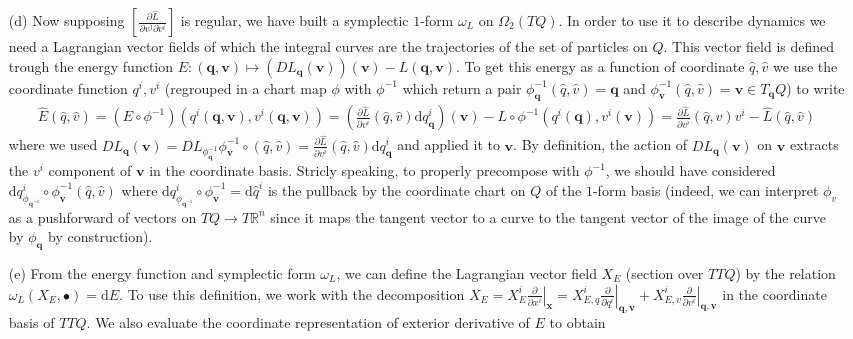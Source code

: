 \documentclass[10pt, a4paper]{article}
\begin{document}
{\begin{enumerate}
  \item[(d)] Now supposing $\left[\frac{\partial \hat{L}}{\partial v^j \partial v^i}\right]$ is regular, we have built a symplectic $1$-form $\omega_L$ on $\Omega_2(TQ)$. In order to use it to describe dynamics we need a Lagrangian vector fields of which the integral curves are the trajectories of the set of particles on $Q$. This vector field is defined trough the energy function $E : (\mathbf{q}, \mathbf{v}) \mapsto (DL_{\mathbf{q}}(\mathbf{v}))(\mathbf{v}) - L(\mathbf{q}, \mathbf{v})$. To get this energy as a function of coordinate $\hat{q}, \hat{v}$ we use the coordinate function $q^{i}, v^{i}$ (regrouped in a chart map $\phi$ with $\phi^{-1}$ which return a pair $\phi^{-1}_{\mathbf{q}}(\hat{q}, \hat{v}) = \mathbf{q}$ and $\phi^{-1}_{\mathbf{v}}(\hat{q}, \hat{v}) = \mathbf{v}\in T_{\mathbf{q}}Q$) to write 
  \begin{align*}
    \hat{E}(\hat{q}, \hat{v}) = (E \circ \phi^{-1})(q^{i}(\mathbf{q}, \mathbf{v}), v^{i}(\mathbf{q}, \mathbf{v})) = \left(\frac{\partial \hat{L}}{\partial v^i} (\hat{q}, \hat{v}) \text{d}q^{i}_{\mathbf{q}}\right)(\mathbf{v}) - L\circ \phi^{-1} (q^{i}(\mathbf{q}), v^i(\mathbf{v})) =  \frac{\partial \hat{L}}{\partial v^i} (\hat{q}, \hat{v}) v^i - \hat{L}(\hat{q}, \hat{v})
  \end{align*} 
  where we used $DL_{\mathbf{q}}(\mathbf{v}) = DL_{\phi^{-1}_{\mathbf{q}}} \phi^{-1}_{\mathbf{v}}\circ (\hat{q}, \hat{v}) = \frac{\partial \hat{L}}{\partial v^i} (\hat{q}, \hat{v}) \text{d}q^{i}_{\mathbf{q}}$ and applied it to $\mathbf{v}$. By definition, the action of $DL_{\mathbf{q}}(\mathbf{v})$ on $\mathbf{v}$ extracts the $v^i$ component of $\mathbf{v}$ in the coordinate basis. Stricly speaking, to properly precompose with $\phi^{-1}$, we should have considered $\text{d}q^{i}_{\phi_{\mathbf{q}^{-1}}} \circ \phi_\mathbf{v}^{-1}(\hat{q}, \hat{v})$  where $\text{d}q^{i}_{\phi_{\mathbf{q}^{-1}}}\circ \phi_\mathbf{v}^{-1} = \text{d}\hat{q}^i$ is the pullback by the coordinate chart on $Q$ of the $1$-form basis (indeed, we can interpret $\phi_v$ as a pushforward of vectors on $TQ \to T\mathbb{R}^n$ since it maps the tangent vector to a curve to the tangent vector of the image of the curve by $\phi_\mathbf{q}$ by construction).
  \item[(e)] From the energy function and symplectic form $\omega_L$, we can define the Lagrangian vector field $X_E$ (section over $TTQ$) by the relation $\omega_L(X_E, \bullet) = \text{d}E$. To use this definition, we work with the decomposition $X_E = X_E^{i}\left.\frac{\partial}{\partial x^i}\right|_{\mathbf{x}} = X_{E, q}^{i} \left.\frac{\partial}{\partial q^i}\right|_{\mathbf{q}, \mathbf{v}} + X_{E, v}^{i} \left.\frac{\partial}{\partial v^i}\right|_{\mathbf{q}, \mathbf{v}}$ in the coordinate basis of $TTQ$. We also evaluate the coordinate representation of exterior derivative of $E$ to obtain 

\end{enumerate}}
\end{document}
